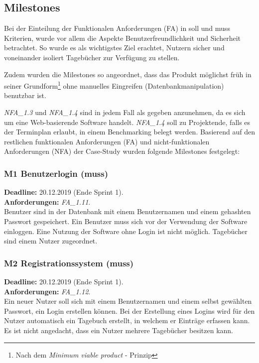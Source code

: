\subsection{Milestones}
Bei der Einteilung der Funktionalen Anforderungen (FA) in soll und muss Kriterien, wurde vor allem die Aspekte Benutzerfreundlichkeit und Sicherheit betrachtet. So wurde es als wichtigstes Ziel erachtet, Nutzern sicher und voneinander isoliert Tagebücher zur Verfügung zu stellen.

Zudem wurden die Milestones so angeordnet, dass das Produkt möglichst früh in seiner Grundform\footnote{Nach dem \emph{Minimum viable product} - Prinzip} ohne manuelles Eingreifen (Datenbankmanipulation) benutzbar ist.

\emph{NFA\_1.3} und \emph{NFA\_1.4} sind in jedem Fall als gegeben anzunehmen, da es sich um eine Web-basierende Software handelt. \emph{NFA\_1.4} soll zu Projektende, falls es der Terminplan erlaubt, in einem Benchmarking belegt werden. Basierend auf den restlichen funktionalen Anforderungen (FA) und nicht-funktionalen Anforderungen (NFA) der Case-Study wurden folgende Milestones festgelegt:

\subsubsection*{M1 Benutzerlogin (muss)}
\textbf{Deadline: } 20.12.2019 (Ende Sprint 1). \\
\textbf{Anforderungen: }\emph{FA\_1.11}.\\
Benutzer sind in der Datenbank mit einem Benutzernamen und einem gehashten Passwort gespeichert. Ein Benutzer muss sich vor der Verwendung der Software einloggen. Eine Nutzung der Software ohne Login ist nicht möglich. Tagebücher sind einem Nutzer zugeordnet.

\subsubsection*{M2 Registrationssystem (muss)}
\textbf{Deadline: } 20.12.2019 (Ende Sprint 1). \\
\textbf{Anforderungen: }\emph{FA\_1.12}.\\
Ein neuer Nutzer soll sich mit einem Benutzernamen und einem selbst gewählten Passwort, ein Login erstellen können. Bei der Erstellung eines Logins wird für den Nutzer automatisch ein Tagebuch erstellt, in welchem er Einträge erfassen kann. Es ist nicht angedacht, dass ein Nutzer mehrere Tagebücher besitzen kann.

